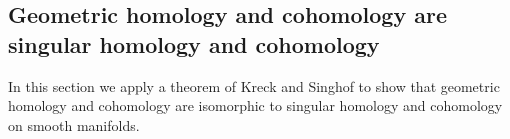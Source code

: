 \subsection{Geometric homology and cohomology are singular homology and cohomology}\label{S: homology is homology}

In this section we apply a theorem of Kreck and Singhof to show that geometric homology and cohomology are isomorphic to singular homology and cohomology on smooth manifolds.

